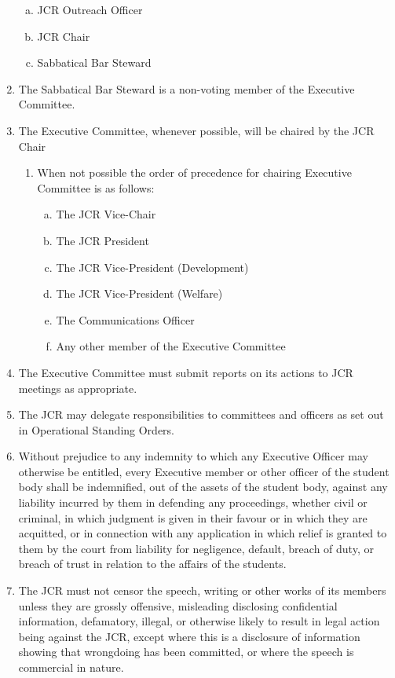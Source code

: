 \documentclass[12pt]{article}  %
\begin{document}
\begin{enumerate}
\begin{enumerate}[(a)]
        \item JCR Outreach Officer
        \item JCR Chair
        \item Sabbatical Bar Steward
    \end{enumerate}
    \item The Sabbatical Bar Steward is a non-voting member of the Executive Committee.
    \item The Executive Committee, whenever possible, will be chaired by the JCR Chair
    \begin{enumerate}
        \item When not possible the order of precedence for chairing Executive Committee is as follows:
        \begin{enumerate}[(a)]
            \item The JCR Vice-Chair
            \item The JCR President
            \item The JCR Vice-President (Development)
            \item The JCR Vice-President (Welfare)
            \item The Communications Officer
            \item Any other member of the Executive Committee
        \end{enumerate}
    \end{enumerate}
    \item The Executive Committee must submit reports on its actions to JCR meetings as appropriate.
    \item The JCR may delegate responsibilities to committees and officers as set out in Operational Standing Orders.
    \item Without prejudice to any indemnity to which any Executive Officer may otherwise be entitled, every Executive member or other officer of the student body shall be indemnified, out of the assets of the student body, against any liability incurred by them in defending any proceedings, whether civil or criminal, in which judgment is given in their favour or in which they are acquitted, or in connection with any application in which relief is granted to them by the court from liability for negligence, default, breach of duty, or breach of trust in relation to the affairs of the students.
    \item The JCR must not censor the speech, writing or other works of its members unless they are grossly offensive, misleading disclosing confidential information, defamatory, illegal, or otherwise likely to result in legal action being against the JCR, except where this is a disclosure of information showing that wrongdoing has been committed, or where the speech is commercial in nature.
\end{enumerate}
\newpage
\end{document}
